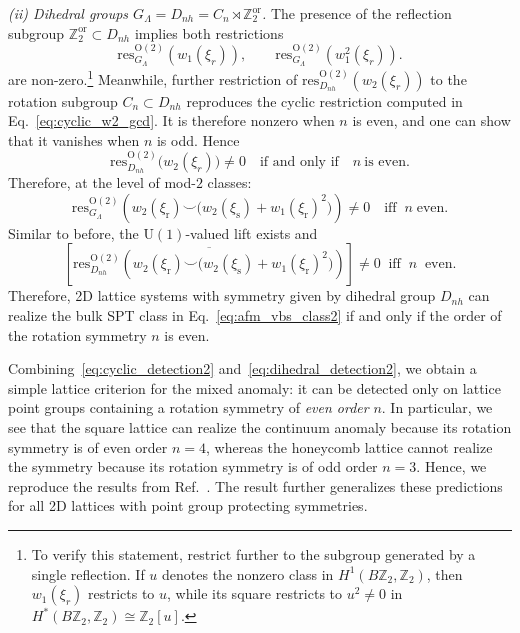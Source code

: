 \documentclass[aps,prx,reprint,superscriptaddress,twocolumn,amsmath,amssymb,amsfonts, nofootinbib]{revtex4-2}
\newcommand{\res}{\text{res}}
\newcommand{\Z}{\mathbb{Z}}
\theoremstyle{apsstyle}
\begin{document}
\bigskip

\noindent\textit{(ii) Dihedral groups $G_{\Lambda}=D_{nh}=C_{n}\rtimes \Z_{2}^{\mathrm{or}}$.}
The presence of the reflection subgroup $\Z_{2}^{\mathrm{or}}\subset D_{nh}$ implies both restrictions 
\begin{equation*}
\res^{\mathrm{O(2)}}_{G_{\Lambda}}(w_{1}(\xi_{r})),\qquad 
\res^{\mathrm{O(2)}}_{G_{\Lambda}}(w_{1}^{2}(\xi_{r})).
\end{equation*}
are non-zero.\footnote{To verify this statement, restrict further to the subgroup generated by a single reflection. If $u$ denotes the nonzero class in $H^{1}(B\mathbb Z_{2},\mathbb Z_{2})$, then $w_{1}(\xi_r)$ restricts to $u$, while its square restricts to $u^{2}\neq 0$ in $H^{*}(B\mathbb Z_{2},\mathbb Z_{2})\cong\mathbb Z_{2}[u]$.} Meanwhile, further restriction of $\res^{\mathrm{O}(2)}_{D_{nh}}(w_{2}(\xi_{r}))$ to the rotation subgroup $C_n\subset D_{nh}$ reproduces the cyclic restriction computed in Eq.~\eqref{eq:cyclic_w2_gcd}. It is therefore nonzero when $n$ is even, and one can show that it vanishes when $n$ is odd. Hence
\begin{equation*}
    \res^{\mathrm{O}(2)}_{D_{nh}}\bigl(w_{2}(\xi_{r})\bigr)
    \neq 0
    \quad\text{if and only if}\quad
    n\ \text{is even}.
\end{equation*}Therefore, at the level of mod-$2$ classes:
\begin{equation}
    \res^{\mathrm{O(2)}}_{G_{\Lambda}}\left(w_{2}(\xi_{\mathrm{r}})\smile\bigl(w_{2}(\xi_{\mathrm{s}})+w_{1}(\xi_{\mathrm{r}})^{2}\bigr)\right )\neq 0 
    \quad\text{iff}\;\; n \; \text{even}.
    \label{eq:dihedral_detection1}
\end{equation}
Similar to before, the $\mathrm{U}(1)$-valued lift exists and \begin{equation}
    \left[\overline{\res^{\mathrm{O(2)}}_{D_{nh}}\left(w_{2}(\xi_{\mathrm{r}})\smile\bigl(w_{2}(\xi_{\mathrm{s}})+w_{1}(\xi_{\mathrm{r}})^{2}\bigr)\right )}\right]\neq 0 \;\;\text{iff} \;\; n\;\; \text{even}.
    \label{eq:dihedral_detection2}
\end{equation}
Therefore, 2D lattice systems with symmetry given by dihedral group $D_{nh}$ can realize the bulk SPT class in Eq.~\ref{eq:afm_vbs_class2} if and only if the order of the rotation symmetry $n$ is even.

\medskip
Combining~\eqref{eq:cyclic_detection2} and~\eqref{eq:dihedral_detection2}, we obtain a simple lattice criterion for the mixed anomaly: it can be detected only on
lattice point groups containing a rotation symmetry of \emph{even order} $n.$ In particular, we see that the square lattice can realize the continuum anomaly because its rotation symmetry is of even order $n=4$, whereas the honeycomb lattice cannot realize the symmetry because its rotation symmetry is of odd order $n=3$. Hence, we reproduce the results from Ref.~\cite{spatial_symm_3}. The result further generalizes these predictions for all 2D lattices with point group protecting symmetries.
\end{document}
